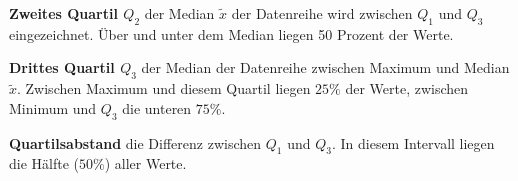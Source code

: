 \textbf{Zweites Quartil $Q_{2}$}  der Median $\tilde{x}$ der Datenreihe wird zwischen $Q_{1}$ und $Q_{3}$ eingezeichnet. \"{U}ber und unter dem Median liegen 50 Prozent der Werte.

\textbf{Drittes Quartil $Q_{3}$}  der Median der Datenreihe zwischen Maximum und Median $\tilde{x}$. Zwischen Maximum und diesem Quartil liegen $25\%$ der Werte, zwischen Minimum und $Q_{3}$ die unteren $75\%$.

\textbf{Quartilsabstand}  die Differenz zwischen $Q_{1}$ und $Q_{3}$. In diesem Intervall liegen die H\"{a}lfte ($50 \%$) aller Werte.



